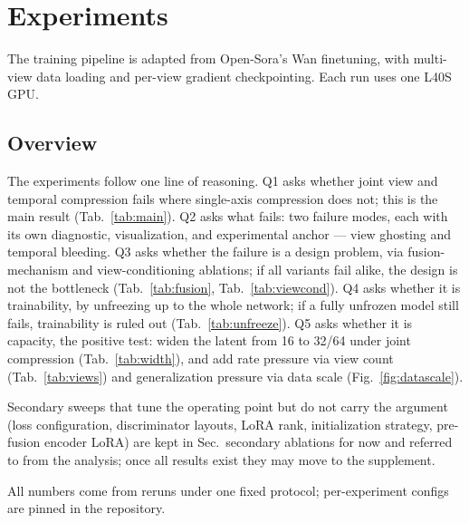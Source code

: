 

\section{Experiments}

The training pipeline is adapted from Open-Sora's Wan finetuning, with multi-view data loading and per-view gradient checkpointing. Each run uses one L40S GPU.

\subsection{Overview}

The experiments follow one line of reasoning.
Q1 asks whether joint view and temporal compression fails where single-axis compression does not; this is the main result (Tab.~\ref{tab:main}).
Q2 asks what fails: two failure modes, each with its own diagnostic, visualization, and experimental anchor --- view ghosting and temporal bleeding.
Q3 asks whether the failure is a design problem, via fusion-mechanism and view-conditioning ablations; if all variants fail alike, the design is not the bottleneck (Tab.~\ref{tab:fusion}, Tab.~\ref{tab:viewcond}).
Q4 asks whether it is trainability, by unfreezing up to the whole network; if a fully unfrozen model still fails, trainability is ruled out (Tab.~\ref{tab:unfreeze}).
Q5 asks whether it is capacity, the positive test: widen the latent from 16 to 32/64 under joint compression (Tab.~\ref{tab:width}), and add rate pressure via view count (Tab.~\ref{tab:views}) and generalization pressure via data scale (Fig.~\ref{fig:datascale}).

Secondary sweeps that tune the operating point but do not carry the argument (loss configuration, discriminator layouts, LoRA rank, initialization strategy, pre-fusion encoder LoRA) are kept in Sec.~secondary ablations for now and referred to from the analysis; once all results exist they may move to the supplement.

All numbers come from reruns under one fixed protocol; per-experiment configs are pinned in the repository.


